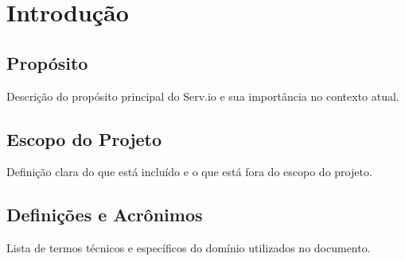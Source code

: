 \section{Introdução}
\subsection{Propósito}
Descrição do propósito principal do Serv.io e sua importância no contexto atual.

\subsection{Escopo do Projeto}
Definição clara do que está incluído e o que está fora do escopo do projeto.

\subsection{Definições e Acrônimos}
Lista de termos técnicos e específicos do domínio utilizados no documento. 